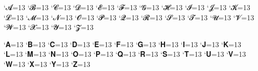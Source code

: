 \catcode`𝓐=13 
\catcode`𝓑=13 
\catcode`𝓒=13 
\catcode`𝓓=13 
\catcode`𝓔=13 
\catcode`𝓕=13 
\catcode`𝓖=13 
\catcode`𝓗=13 
\catcode`𝓘=13 
\catcode`𝓙=13 
\catcode`𝓚=13 
\catcode`𝓛=13 
\catcode`𝓜=13 
\catcode`𝓝=13 
\catcode`𝓞=13 
\catcode`𝓟=13 
\catcode`𝓠=13 
\catcode`𝓡=13 
\catcode`𝓢=13 
\catcode`𝓣=13 
\catcode`𝓤=13 
\catcode`𝓥=13 
\catcode`𝓦=13 
\catcode`𝓧=13 
\catcode`𝓨=13 
\catcode`𝓩=13 

\catcode`𝐀=13 
\catcode`𝐁=13 
\catcode`𝐂=13 
\catcode`𝐃=13 
\catcode`𝐄=13 
\catcode`𝐅=13 
\catcode`𝐆=13 
\catcode`𝐇=13 
\catcode`𝐈=13 
\catcode`𝐉=13 
\catcode`𝐊=13 
\catcode`𝐋=13 
\catcode`𝐌=13 
\catcode`𝐍=13 
\catcode`𝐎=13 
\catcode`𝐏=13 
\catcode`𝐐=13 
\catcode`𝐑=13 
\catcode`𝐒=13 
\catcode`𝐓=13 
\catcode`𝐔=13 
\catcode`𝐕=13 
\catcode`𝐖=13 
\catcode`𝐗=13 
\catcode`𝐘=13 
\catcode`𝐙=13 






